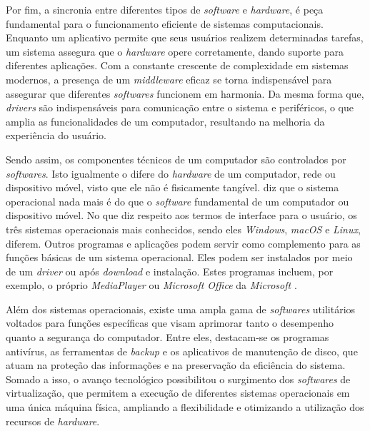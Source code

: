 \documentclass[english,brazilian]{UNISINOSartigo} %
\begin{document}
Por fim, a sincronia entre diferentes tipos de \textit{software} e \textit{hardware}, é peça fundamental para o funcionamento eficiente de sistemas computacionais. Enquanto um aplicativo permite que seus usuários realizem determinadas tarefas, um sistema assegura que o \textit{hardware} opere corretamente, dando suporte para diferentes aplicações. Com a constante crescente de complexidade em sistemas modernos, a presença de um \textit{middleware} eficaz se torna indispensável para assegurar que diferentes \textit{softwares} funcionem em harmonia. Da mesma forma que, \textit{drivers} são indispensáveis para comunicação entre o sistema e periféricos, o que amplia as funcionalidades de um computador, resultando na melhoria da experiência do usuário.

Sendo assim, os componentes técnicos de um computador são controlados por \textit{softwares}. Isto igualmente o difere do \textit{hardware} de um computador, rede ou dispositivo móvel, visto que ele não é fisicamente tangível.  diz que o sistema operacional nada mais é do que o \textit{software} fundamental de um computador ou dispositivo móvel. No que diz respeito aos termos de interface para o usuário, os três sistemas operacionais mais conhecidos, sendo eles \textit{Windows}, \textit{macOS} e \textit{Linux}, diferem. Outros programas e aplicações podem servir como complemento para as funções básicas de um sistema operacional. Eles podem ser instalados por meio de um \textit{driver} ou após \textit{download} e instalação. Estes programas incluem, por exemplo, o próprio \textit{MediaPlayer} ou \textit{Microsoft Office} da \textit{Microsoft} \cite{neto2019}.

Além dos sistemas operacionais, existe uma ampla gama de \textit{softwares} utilitários voltados para funções específicas que visam aprimorar tanto o desempenho quanto a segurança do computador. Entre eles, destacam-se os programas antivírus, as ferramentas de \textit{backup} e os aplicativos de manutenção de disco, que atuam na proteção das informações e na preservação da eficiência do sistema. Somado a isso, o avanço tecnológico possibilitou o surgimento dos \textit{softwares} de virtualização, que permitem a execução de diferentes sistemas operacionais em uma única máquina física, ampliando a flexibilidade e otimizando a utilização dos recursos de \textit{hardware}.
\end{document}
